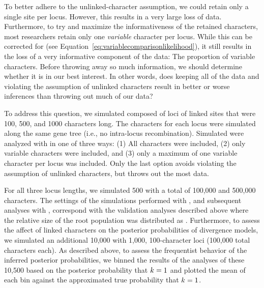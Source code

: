 To better adhere to the unlinked-character assumption, we could retain only a
single site per locus.
However, this results in a very large loss of data.
Furthermore, to try and maximize the informativeness of the retained
characters, most researchers retain only one \emph{variable} character per
locus.
While this can be corrected for (see
Equation~\ref{eq:variablecomparisonlikelihood}), it still results in the loss
of a very informative component of the data: The proportion of variable
characters.
Before throwing away so much information, we should determine whether
it is in our best interest.
In other words, does keeping all of the data and violating the assumption of
unlinked characters result in better or worse inferences than throwing out much
of our data?

To address this question, 
we simulated \datasets composed of loci of linked sites that were 100, 500, and
1000 characters long.
The characters for each locus were simulated along the same gene tree (i.e., no
intra-locus recombination).
Simulated \datasets were analyzed with \ecoevolity in one of three ways:
(1) All characters were included,
(2) only variable characters were included,
and
(3) only a maximum of one variable character per locus was included.
Only the last option avoids violating the assumption of unlinked characters,
but throws out the most data.

For all three locus lengths, we simulated 500 \datasets with a total of 100,000
and 500,000 characters.
The settings of the simulations performed with \simcoevolity, and subsequent
analyses with \ecoevolity, correspond with the validation analyses described
above where the relative size of the root population was distributed as
.
Furthermore, to assess the affect of linked characters on the posterior
probabilities of divergence models, we simulated an additional 10,000 \datasets
with 1,000, 100-character loci (100,000 total characters each).
As described above, to assess the frequentist behavior of the inferred
posterior probabilities, we binned the results of the analyses of these 10,500
\datasets based on the posterior probability that $k_{}{} = 1$ and plotted
the mean of each bin against the approximated true probability that $k_{}{}
= 1$.

